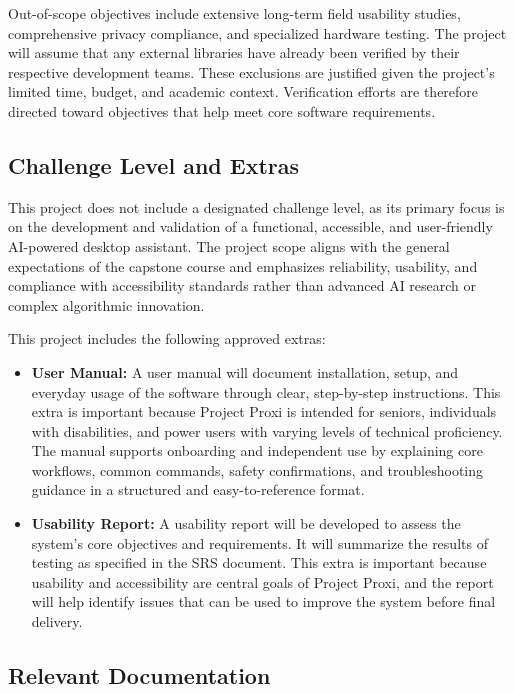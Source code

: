 \documentclass[12pt, titlepage]{article}
\begin{document}
Out-of-scope objectives include extensive long-term field usability
studies, comprehensive privacy compliance, and specialized hardware
testing. The project will assume that any external libraries have
already been verified by their respective development teams. These
exclusions are justified given the project's limited time, budget, and
academic context. Verification efforts are therefore directed toward
objectives that help meet core software requirements.

\subsection{Challenge Level and Extras}

This project does not include a designated challenge level, as its
primary focus is on the development and validation of a functional,
accessible, and user-friendly AI-powered desktop assistant. The project
scope aligns with the general expectations of the capstone course and
emphasizes reliability, usability, and compliance with accessibility
standards rather than advanced AI research or complex algorithmic
innovation.

\noindent This project includes the following approved extras:
\begin{itemize}
  \item \textbf{User Manual:} A user manual will document installation,
  setup, and everyday usage of the software through clear, step-by-step
  instructions. This extra is important because Project Proxi is intended
  for seniors, individuals with disabilities, and power users with
  varying levels of technical proficiency. The manual supports onboarding
  and independent use by explaining core workflows, common commands,
  safety confirmations, and troubleshooting guidance in a structured and
  easy-to-reference format.
  \item \textbf{Usability Report:} A usability report will be developed
  to assess the system's core objectives and requirements. It will
  summarize the results of testing as specified in the SRS document.
  This extra is important because usability and accessibility are
  central goals of Project Proxi, and the report will help identify
  issues that can be used to improve the system before final delivery.
\end{itemize}

\subsection{Relevant Documentation}
\end{document}

